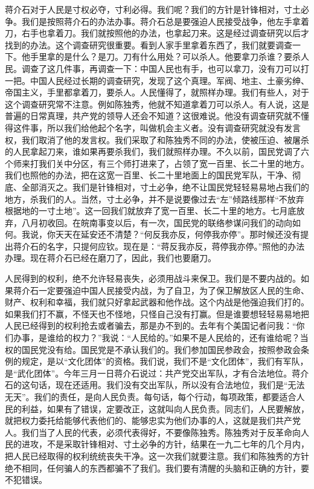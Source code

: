 蒋介石对于人民是寸权必夺，寸利必得。我们呢？我们的方针是针锋相对，寸土必争。我们是按照蒋介石的办法办事。蒋介石总是要强迫人民接受战争，他左手拿着刀，右手也拿着刀。我们就按照他的办法，也拿起刀来。这是经过调查研究以后才找到的办法。这个调查研究很重要。看到人家手里拿着东西了，我们就要调查一下。他手里拿的是什么？是刀。刀有什么用处？可以杀人。他要拿刀杀谁？要杀人民。调查了这几件事，再调查一下：中国人民也有手，也可以拿刀，没有刀可以打一把。中国人民经过长期的调查研究，发现了这个真理。军阀、地主、土豪劣绅、帝国主义，手里都拿着刀，要杀人。人民懂得了，就照样办理。我们有些人，对于这个调查研究常不注意。例如陈独秀，他就不知道拿着刀可以杀人。有人说，这是普遍的日常真理，共产党的领导人还会不知道？这很难说。他没有调查研究就不懂得这件事，所以我们给他起个名字，叫做机会主义者。没有调查研究就没有发言权，我们取消了他的发言权。我们采取了和陈独秀不同的办法，使被压迫、被屠杀的人民拿起刀来，谁如果再要杀我们，我们就照样办理。不久以前，国民党调了六个师来打我们关中分区，有三个师打进来了，占领了宽一百里、长二十里的地方。我们也照他的办法，把在这宽一百里、长二十里地面上的国民党军队，干净、彻底、全部消灭之。我们是针锋相对，寸土必争，绝不让国民党轻轻易易地占我们的地方，杀我们的人。当然，寸土必争，并不是说要像过去“左”倾路线那样“不放弃根据地的一寸土地”。这一回我们就放弃了宽一百里、长二十里的地方。七月底放弃，八月初收回。在皖南事变以后，有一次，国民党的联络参谋问我们的动向如何。我说，你天天在延安还不清楚？“何反我亦反，何停我亦停”。那时候还没有提出蒋介石的名字，只提何应钦。现在是：“蒋反我亦反，蒋停我亦停。”照他的办法办理。现在蒋介石已经在磨刀了，因此，我们也要磨刀。

人民得到的权利，绝不允许轻易丧失，必须用战斗来保卫。我们是不要内战的。如果蒋介石一定要强迫中国人民接受内战，为了自卫，为了保卫解放区人民的生命、财产、权利和幸福，我们就只好拿起武器和他作战。这个内战是他强迫我们打的。如果我们打不赢，不怪天也不怪地，只怪自己没有打赢。但是谁要想轻轻易易地把人民已经得到的权利抢去或者骗去，那是办不到的。去年有个美国记者问我：“你们办事，是谁给的权力？”我说：“人民给的。”如果不是人民给的，还有谁给呢？当权的国民党没有给。国民党是不承认我们的。我们参加国民参政会，按照参政会条例的规定，是以“文化团体”的资格。我们说，我们不是“文化团体”，我们有军队，是“武化团体”。今年三月一日蒋介石说过：共产党交出军队，才有合法地位。蒋介石的这句话，现在还适用。我们没有交出军队，所以没有合法地位，我们是“无法无天”。我们的责任，是向人民负责。每句话，每个行动，每项政策，都要适合人民的利益，如果有了错误，定要改正，这就叫向人民负责。同志们，人民要解放，就把权力委托给能够代表他们的、能够忠实为他们办事的人，这就是我们共产党人。我们当了人民的代表，必须代表得好，不要像陈独秀。陈独秀对于反革命向人民的进攻，不是采取针锋相对、寸土必争的方针，结果在一九二七年的几个月内，把人民已经取得的权利统统丧失干净。这一次我们就要注意。我们和陈独秀的方针绝不相同，任何骗人的东西都骗不了我们。我们要有清醒的头脑和正确的方针，要不犯错误。

